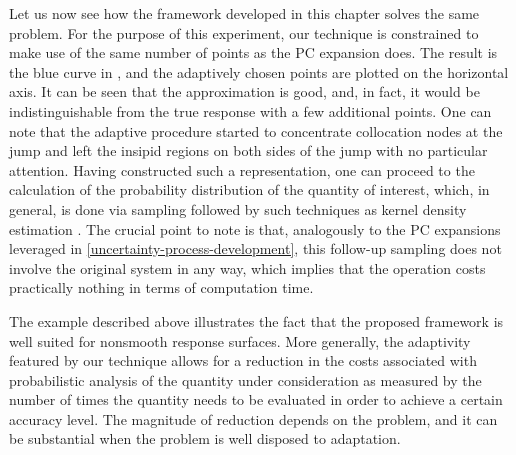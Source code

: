 Let us now see how the framework developed in this chapter solves the same
problem. For the purpose of this experiment, our technique is constrained to
make use of the same number of points as the \ac{PC} expansion does. The result
is the blue curve in , and the adaptively chosen points
are plotted on the horizontal axis. It can be seen that the approximation is
good, and, in fact, it would be indistinguishable from the true response with a
few additional points. One can note that the adaptive procedure started to
concentrate collocation nodes at the jump and left the insipid regions on both
sides of the jump with no particular attention. Having constructed such a
representation, one can proceed to the calculation of the probability
distribution of the quantity of interest, which, in general, is done via
sampling followed by such techniques as kernel density estimation
\cite{hastie2013}. The crucial point to note is that, analogously to the \ac{PC}
expansions leveraged in \cref{uncertainty-process-development}, this follow-up
sampling does not involve the original system in any way, which implies that the
operation costs practically nothing in terms of computation time.

The example described above illustrates the fact that the proposed framework is
well suited for nonsmooth response surfaces. More generally, the adaptivity
featured by our technique allows for a reduction in the costs associated with
probabilistic analysis of the quantity under consideration as measured by the
number of times the quantity needs to be evaluated in order to achieve a certain
accuracy level. The magnitude of reduction depends on the problem, and it can be
substantial when the problem is well disposed to adaptation.
